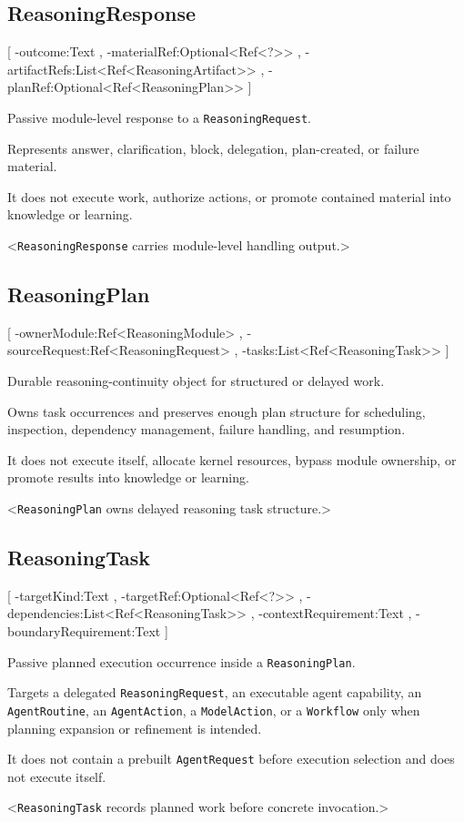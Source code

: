 \subsection{ReasoningResponse}
[
	\UMLAt-outcome:Text ,
	\UMLAt-materialRef:Optional<Ref<?>> ,
	\UMLAt-artifactRefs:List<Ref<ReasoningArtifact>> ,
	\UMLAt-planRef:Optional<Ref<ReasoningPlan>>
]{%
	\item[] Passive module-level response to a \texttt{ReasoningRequest}.
	\item[] Represents answer, clarification, block, delegation, plan-created, or failure material.
	\item[] It does not execute work, authorize actions, or promote contained material into knowledge or learning.
}<\texttt{ReasoningResponse} carries module-level handling output.>

\subsection{ReasoningPlan}
[
	\UMLAt-ownerModule:Ref<ReasoningModule> ,
	\UMLAt-sourceRequest:Ref<ReasoningRequest> ,
	\UMLAt-tasks:List<Ref<ReasoningTask>>
]{%
	\item[] Durable reasoning-continuity object for structured or delayed work.
	\item[] Owns task occurrences and preserves enough plan structure for scheduling, inspection, dependency management, failure handling, and resumption.
	\item[] It does not execute itself, allocate kernel resources, bypass module ownership, or promote results into knowledge or learning.
}<\texttt{ReasoningPlan} owns delayed reasoning task structure.>

\subsection{ReasoningTask}
[
	\UMLAt-targetKind:Text ,
	\UMLAt-targetRef:Optional<Ref<?>> ,
	\UMLAt-dependencies:List<Ref<ReasoningTask>> ,
	\UMLAt-contextRequirement:Text ,
	\UMLAt-boundaryRequirement:Text
]{%
	\item[] Passive planned execution occurrence inside a \texttt{ReasoningPlan}.
	\item[] Targets a delegated \texttt{ReasoningRequest}, an executable agent capability, an \texttt{AgentRoutine}, an \texttt{AgentAction}, a \texttt{ModelAction}, or a \texttt{Workflow} only when planning expansion or refinement is intended.
	\item[] It does not contain a prebuilt \texttt{AgentRequest} before execution selection and does not execute itself.
}<\texttt{ReasoningTask} records planned work before concrete invocation.>

